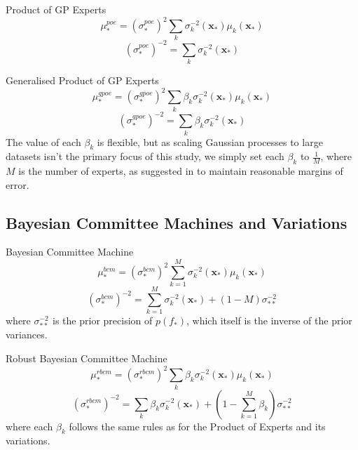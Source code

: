 Product of GP Experts
\begin{equation}
    \mu_*^{poe} = (\sigma_*^{poe})^2 \sum_k \sigma_k^{-2} (\mathbf{x_*}) \mu_k (\mathbf{x_*})
\end{equation}
\begin{equation}
    (\sigma_*^{poe})^{-2} = \sum_k \sigma_k^{-2} (\mathbf{x_*})
\end{equation}

Generalised Product of GP Experts
\begin{equation}
    \mu_*^{gpoe} = (\sigma_*^{gpoe})^2 \sum_k \beta_k \sigma_k^{-2} (\mathbf{x_*}) \mu_k (\mathbf{x_*})
\end{equation}
\begin{equation}
    (\sigma_*^{gpoe})^{-2} = \sum_k \beta_k \sigma_k^{-2} (\mathbf{x_*})
\end{equation}
The value of each $\beta_k$ is flexible, but as scaling Gaussian processes to large datasets isn't the primary focus of this study, we simply set each $\beta_k$ to $\frac{1}{M}$, where $M$ is the number of experts, as suggested in \citep{deisenroth15} to maintain reasonable margins of error.

\subsection{Bayesian Committee Machines and Variations}

Bayesian Committee Machine
\begin{equation}
    \mu_*^{bcm} = (\sigma_*^{bcm})^2 \sum_{k=1}^M \sigma_k^{-2} (\mathbf{x_*}) \mu_k (\mathbf{x_*})
\end{equation}
\begin{equation}
    (\sigma_*^{bcm})^{-2} = \sum_{k=1}^M \sigma_k^{-2} (\mathbf{x_*}) + (1-M)\sigma_{**}^{-2}
\end{equation}
where $\sigma_{**}^{-2}$ is the prior precision of $p(f_*)$, which itself is the inverse of the prior variances.

Robust Bayesian Committee Machine
\begin{equation}
    \mu_*^{rbcm} = (\sigma_*^{rbcm})^2 \sum_k \beta_k \sigma_k^{-2} (\mathbf{x_*}) \mu_k (\mathbf{x_*})
\end{equation}
\begin{equation}
    (\sigma_*^{rbcm})^{-2} = \sum_k \beta_k \sigma_k^{-2} (\mathbf{x_*}) + (1-\sum_{k=1}^M \beta_k) \sigma_{**}^{-2}
\end{equation}
where each $\beta_k$ follows the same rules as for the Product of Experts and its variations.

